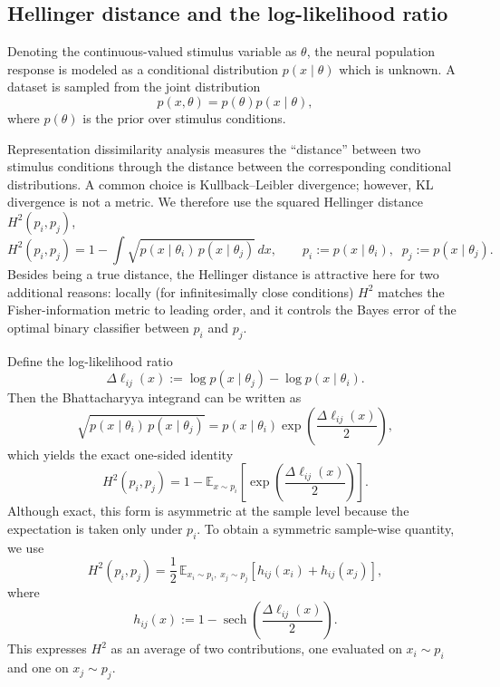 \subsection{Hellinger distance and the log-likelihood ratio}

Denoting the continuous-valued stimulus variable as $\theta$, the neural population response is modeled as a conditional distribution $p(x\mid \theta)$ which is unknown. A dataset is sampled from the joint distribution
\begin{equation}
    p(x,\theta)=p(\theta)p(x\mid \theta),
\end{equation}
where $p(\theta)$ is the prior over stimulus conditions.

Representation dissimilarity analysis measures the ``distance'' between two stimulus conditions through the distance between the corresponding conditional distributions. A common choice is Kullback--Leibler divergence; however, KL divergence is not a metric. We therefore use the squared Hellinger distance $H^2(p_i,p_j)$,
\begin{equation}
    H^2(p_i,p_j)
    =
    1-\int \sqrt{p(x\mid \theta_i)\,p(x\mid \theta_j)}\,dx,
    \qquad
    p_i:=p(x\mid \theta_i),\;\; p_j:=p(x\mid \theta_j).
\end{equation}
Besides being a true distance, the Hellinger distance is attractive here for two additional reasons: locally (for infinitesimally close conditions) $H^2$ matches the Fisher-information metric to leading order, and it controls the Bayes error of the optimal binary classifier between $p_i$ and $p_j$.

Define the log-likelihood ratio
\begin{equation}
    \Delta \ell_{ij}(x)
    :=
    \log p(x\mid \theta_j)-\log p(x\mid \theta_i).
\end{equation}
Then the Bhattacharyya integrand can be written as
\begin{equation}
    \sqrt{p(x\mid \theta_i)\,p(x\mid \theta_j)}
    =
    p(x\mid \theta_i)\exp\!\left(\frac{\Delta \ell_{ij}(x)}{2}\right),
\end{equation}
which yields the exact one-sided identity
\begin{equation}
    H^2(p_i,p_j)
    =
    1-
    \mathbb{E}_{x\sim p_i}
    \left[
    \exp\!\left(\frac{\Delta \ell_{ij}(x)}{2}\right)
    \right].
\end{equation}
Although exact, this form is asymmetric at the sample level because the expectation is taken only under $p_i$. To obtain a symmetric sample-wise quantity, we use
\begin{equation}
    H^2(p_i,p_j)
    =
    \frac12\,
    \mathbb{E}_{x_i\sim p_i,\;x_j\sim p_j}
    \left[
    h_{ij}(x_i)+h_{ij}(x_j)
    \right],
\end{equation}
where
\begin{equation}
    h_{ij}(x)
    :=
    1-\operatorname{sech}\!\left(\frac{\Delta \ell_{ij}(x)}{2}\right).
\end{equation}
This expresses $H^2$ as an average of two contributions, one evaluated on $x_i\sim p_i$ and one on $x_j\sim p_j$.

